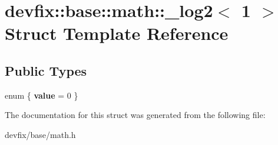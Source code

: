 \hypertarget{structdevfix_1_1base_1_1math_1_1__log2_3_011_01_4}{}\section{devfix\+:\+:base\+:\+:math\+:\+:\+\_\+log2$<$ 1 $>$ Struct Template Reference}
\label{structdevfix_1_1base_1_1math_1_1__log2_3_011_01_4}
\subsection*{Public Types}
\begin{DoxyCompactItemize}
\item 
\mbox{\label{structdevfix_1_1base_1_1math_1_1__log2_3_011_01_4_ae77c39556ff5e646dc219024b8147b3d}} 
enum \{ {\bfseries value} = 0
 \}
\end{DoxyCompactItemize}


The documentation for this struct was generated from the following file\+:\begin{DoxyCompactItemize}
\item 
devfix/base/math.\+h\end{DoxyCompactItemize}
